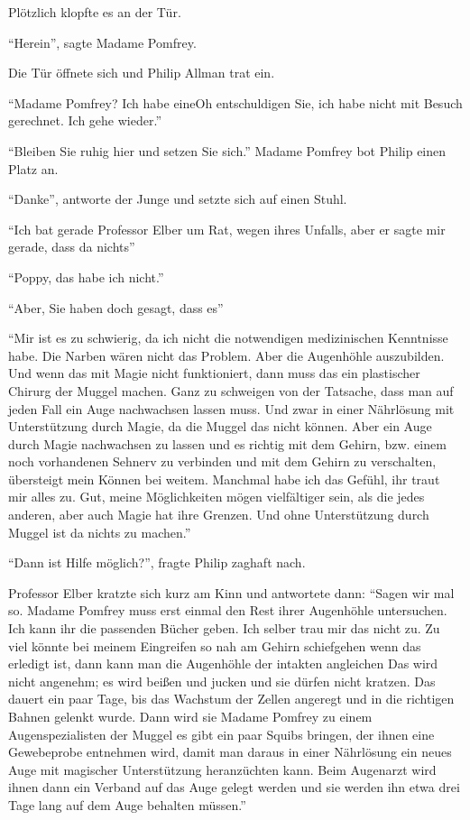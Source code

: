 Plötzlich klopfte es an der Tür.

\enquote{Herein}, sagte Madame Pomfrey.

Die Tür öffnete sich und Philip Allman trat ein.

\enquote{Madame Pomfrey? Ich habe eine\abs Oh entschuldigen Sie, ich habe nicht mit Besuch gerechnet. Ich gehe wieder.}

\enquote{Bleiben Sie ruhig hier und setzen Sie sich.} Madame Pomfrey bot Philip einen Platz an.

\enquote{Danke}, antworte der Junge und setzte sich auf einen Stuhl.

\enquote{Ich bat gerade Professor Elber um Rat, wegen ihres Unfalls, aber er sagte mir gerade, dass da nichts\abs}

\enquote{Poppy, das habe ich nicht.}

\enquote{Aber, Sie haben doch gesagt, dass es\abs}

\enquote{Mir ist es zu schwierig, da ich nicht die notwendigen medizinischen Kenntnisse habe. Die Narben wären nicht das Problem. Aber die Augenhöhle auszubilden. Und wenn das mit Magie nicht funktioniert, dann muss das ein plastischer Chirurg der Muggel machen. Ganz zu schweigen von der Tatsache, dass man auf jeden Fall ein Auge nachwachsen lassen muss. Und zwar in einer Nährlösung mit Unterstützung durch Magie, da die Muggel das nicht können. Aber ein Auge durch Magie nachwachsen zu lassen und es richtig mit dem Gehirn, bzw. einem noch vorhandenen Sehnerv zu verbinden und mit dem Gehirn zu verschalten, übersteigt mein Können bei weitem. \gst Manchmal habe ich das Gefühl, ihr traut mir alles zu. Gut, meine Möglichkeiten mögen vielfältiger sein, als die jedes anderen, aber auch Magie hat ihre Grenzen. Und ohne Unterstützung durch Muggel ist da nichts zu machen.}

\enquote{Dann ist Hilfe möglich?}, fragte Philip zaghaft nach.

Professor Elber kratzte sich kurz am Kinn und antwortete dann: \enquote{Sagen wir mal so. Madame Pomfrey muss erst einmal den Rest ihrer Augenhöhle untersuchen. Ich kann ihr die passenden Bücher geben. Ich selber trau mir das nicht zu. Zu viel könnte bei meinem Eingreifen so nah am Gehirn schiefgehen \gst wenn das erledigt ist, dann kann man die Augenhöhle der intakten angleichen \gst Das wird nicht angenehm; es wird beißen und jucken und sie dürfen nicht kratzen. Das dauert ein paar Tage, bis das Wachstum der Zellen angeregt und in die richtigen Bahnen gelenkt wurde. \gst Dann wird sie Madame Pomfrey zu einem Augenspezialisten der Muggel \gst es gibt ein paar Squibs \gst bringen, der ihnen eine Gewebeprobe entnehmen wird, damit man daraus in einer Nährlösung ein neues Auge mit magischer Unterstützung heranzüchten kann. Beim Augenarzt wird ihnen dann ein Verband auf das Auge gelegt werden und sie werden ihn etwa drei Tage lang auf dem Auge behalten müssen.}

